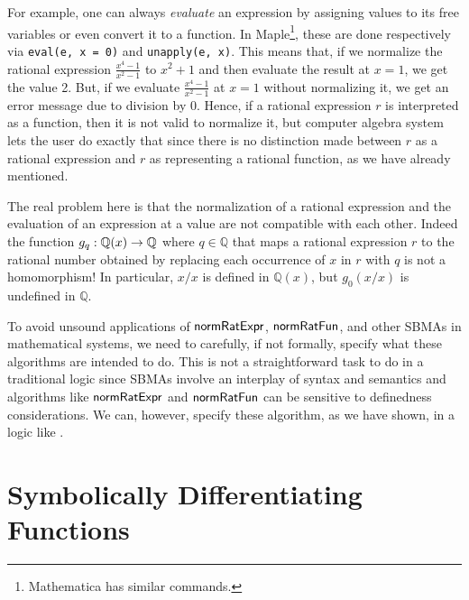 \documentclass[fleqn]{llncs}
\newcommand{\QQ}{\ensuremath{\mathbb{Q}}}
\newcommand{\NRE}{\ensuremath{\mname{normRatExpr}}}
\newcommand{\NRF}{\ensuremath{\mname{normRatFun}}}
\begin{document}
For example, one can always \emph{evaluate} an expression by assigning
values to its free variables or even convert it to a function.  In
Maple\footnote{Mathematica has similar commands.}, these are done
respectively via \texttt{eval(e, x = 0)} and \texttt{unapply(e, x)}.
This means that, if we normalize the rational expression
$\frac{x^4-1}{x^2-1}$ to $x^2+1$ and then evaluate the result at $x =
1$, we get the value 2.  But, if we evaluate $\frac{x^4-1}{x^2-1}$ at
$x = 1$ without normalizing it, we get an error message due to
division by 0.  Hence, if a rational expression $r$ is interpreted as
a function, then it is not valid to normalize it, but computer algebra
system lets the user do exactly that since there is no distinction
made between $r$ as a rational expression and $r$ as representing a
rational function, as we have already mentioned.

The real problem here is that the normalization of a rational
expression and the evaluation of an expression at a value are not
compatible with each other.  Indeed the function $g_q : \QQ(x) \tarrow
\QQ$ where $q \in \QQ$ that maps a rational expression $r$ to the
rational number obtained by replacing each occurrence of $x$ in $r$
with $q$ is not a homomorphism!  In particular, $x/x$ is defined in
$\QQ(x)$, but $g_0(x/x)$ is undefined in $\QQ$.

\iffalse

We can exhibit the problematic behavior as follows: \todo{insert some
  Maple code with output here} In fact, there is an even more
pervasive, one could even say \emph{obnoxious}, way of doing this: as
the underlying language is \emph{imperative}, it is possible to do:
\begin{verbatim}
  e := (x^4-1)/(x^2-1);
  # many, many more lines of 'code'
  x := 1;
  # try to use 'e'
\end{verbatim}

\fi

To avoid unsound applications of {\NRE}, {\NRF}, and other SBMAs in
mathematical systems, we need to carefully, if not formally, specify
what these algorithms are intended to do.  This is not a
straightforward task to do in a traditional logic since SBMAs involve
an interplay of syntax and semantics and algorithms like {\NRE} and
{\NRF} can be sensitive to definedness considerations.  We can,
however, specify these algorithm, as we have shown, in a logic like
{\churchqe}.

\section{Symbolically Differentiating Functions}\label{sec:diff}
\end{document}

